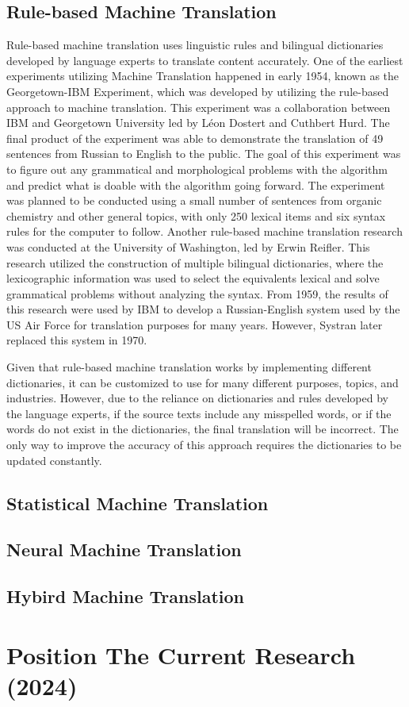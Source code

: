 \documentclass[sigconf]{acmart}
\begin{document}
    \subsection{Rule-based Machine Translation}
        Rule-based machine translation uses linguistic rules and bilingual dictionaries developed by language experts to translate content accurately\cite{Amazon_MT}. One of the earliest experiments utilizing Machine Translation happened in early 1954, known as the Georgetown-IBM Experiment, which was developed by utilizing the rule-based approach to machine translation. This experiment was a collaboration between IBM and Georgetown University led by Léon Dostert and Cuthbert Hurd. The final product of the experiment was able to demonstrate the translation of 49 sentences from Russian to English to the public\cite{Hutchins_2001}. The goal of this experiment was to figure out any grammatical and morphological problems with the algorithm and predict what is doable with the algorithm going forward. The experiment was planned to be conducted using a small number of sentences from organic chemistry and other general topics, with only 250 lexical items and six syntax rules for the computer to follow\cite{Hutchins_2004}. Another rule-based machine translation research was conducted at the University of Washington, led by Erwin Reifler. This research utilized the construction of multiple bilingual dictionaries, where the lexicographic information was used to select the equivalents lexical and solve grammatical problems without analyzing the syntax. From 1959, the results of this research were used by IBM to develop a Russian-English system used by the US Air Force for translation purposes for many years. However, Systran later replaced this system in 1970\cite{Hutchins_2001}.

        Given that rule-based machine translation works by implementing different dictionaries, it can be customized to use for many different purposes, topics, and industries. However, due to the reliance on dictionaries and rules developed by the language experts, if the source texts include any misspelled words, or if the words do not exist in the dictionaries, the final translation will be incorrect. The only way to improve the accuracy of this approach requires the dictionaries to be updated constantly\cite{Amazon_MT}.

    \subsection{Statistical Machine Translation}

    \subsection{Neural Machine Translation}

    \subsection{Hybird Machine Translation}

\section{Position The Current Research (2024)} %



    
\end{document}
